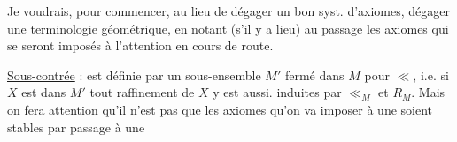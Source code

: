 
Je voudrais, pour commencer, au lieu de dégager un bon syst. d'axiomes, dégager une terminologie géométrique, en notant (s'il y a lieu) au passage les axiomes qui se seront imposés à l'attention en cours de route.


\uline{Sous-contrée} : est définie par un sous-ensemble $M'$   fermé dans $M$ pour $\ll$, i.e. si $X$ est dans $M'$ tout raffinement de $X$ y est aussi.    induites par $\ll_M$ et $R_M$. Mais on fera attention qu'il n'est pas   que les axiomes qu'on va imposer à une  soient  stables par passage à une
